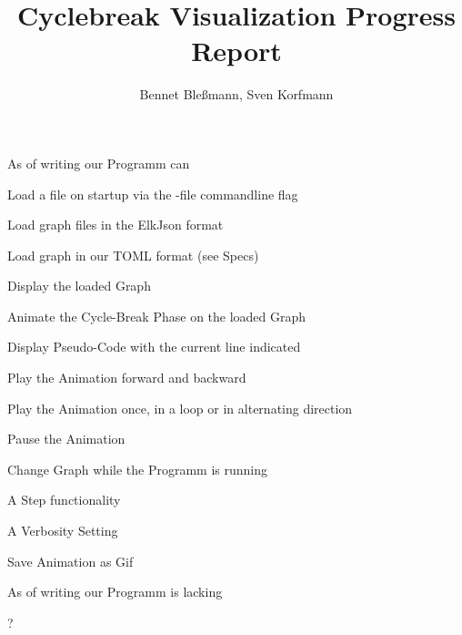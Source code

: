 \documentclass[12pt,a4paper]{article}
\author{Bennet Bleßmann, Sven Korfmann}
\title{Cyclebreak Visualization Progress Report}
\begin{document}
\maketitle

As of writing our Programm can
\begin{list}{-}{}
\item Load a file on startup via the -file commandline flag
\item Load graph files in the ElkJson format
\item Load graph in our TOML format (see Specs) 
\item Display the loaded Graph
\item Animate the Cycle-Break Phase on the loaded Graph
\item Display Pseudo-Code with the current line indicated
\item Play the Animation forward and backward
\item Play the Animation once, in a loop or in alternating direction
\item Pause the Animation
\item Change Graph while the Programm is running
\item A Step functionality
\item A Verbosity Setting
\item Save Animation as Gif

\end{list}

As of writing our Programm is lacking
\begin{list}{-}{}
\item ?
\end{list}
\end{document}
